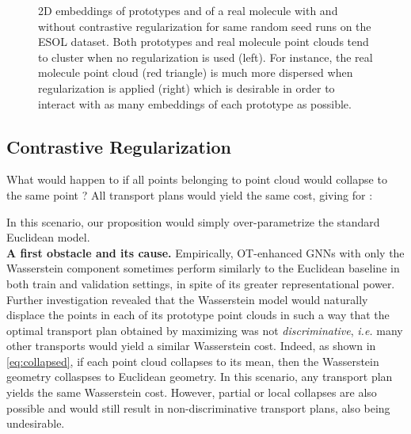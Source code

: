 \documentclass[letterpaper]{article} \usepackage{aaai22}  \usepackage{times}  \usepackage{helvet}  \usepackage{courier}  \usepackage[hyphens]{url}  \usepackage{graphicx} \urlstyle{rm} \def\UrlFont{\rm}  \usepackage{natbib}  \usepackage{caption} \DeclareCaptionStyle{ruled}{labelfont=normalfont,labelsep=colon,strut=off} \frenchspacing  \setlength{\pdfpagewidth}{8.5in}  \setlength{\pdfpageheight}{11in}  \usepackage{algorithm}
\begin{document}
\begin{figure*}[h]
   \hspace{15mm}
   \hspace{15mm}
  \caption{2D embeddings of prototypes and of a real molecule with and without contrastive regularization for same random seed runs on the ESOL dataset. Both prototypes and real molecule point clouds tend to cluster when no regularization is used (left). For instance, the real molecule point cloud (red triangle) is much more dispersed when regularization is applied (right) which is desirable in order to interact with as many embeddings of each prototype as possible.}
  \label{fig:nce_embeddings}
\end{figure*}

\vspace{-0.2cm}
\subsection{Contrastive Regularization}\label{sec:reg}

What would happen to  if all points  belonging to point cloud  would collapse to the same point ? All transport plans would yield the same cost, giving for :

In this scenario, our proposition would simply over-parametrize the standard Euclidean model.\\


\noindent\textbf{A first obstacle and its cause.} Empirically, OT-enhanced GNNs with only the Wasserstein component sometimes perform similarly to the Euclidean baseline in both train and validation settings, in spite of its greater representational power. Further investigation revealed that the Wasserstein model would naturally displace the points in each of its prototype point clouds in such a way that the optimal transport plan  obtained by maximizing  was not \textit{discriminative}, \textit{i.e.} many other transports would yield a similar Wasserstein cost. Indeed, as shown in \cref{eq:collapsed}, if each point cloud collapses to its mean, then the Wasserstein geometry collaspses to Euclidean geometry. In this scenario, any transport plan yields the same Wasserstein cost. However, partial or local collapses are also possible and would still result in non-discriminative transport plans, also being undesirable.
\end{document}
